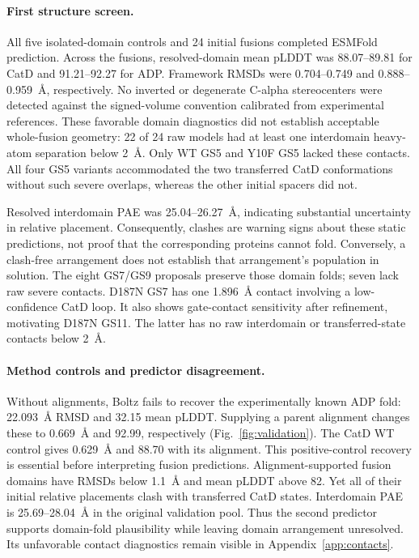 \documentclass{article}
\newcommand{\angstrom}{\textup{\AA}}
\begin{document}
\paragraph{First structure screen.}
All five isolated-domain controls and 24 initial fusions completed ESMFold
prediction. Across the fusions, resolved-domain mean pLDDT was 88.07--89.81 for
CatD and 91.21--92.27 for ADP. Framework RMSDs were 0.704--0.749 and
0.888--0.959~\angstrom, respectively. No inverted or degenerate C-alpha
stereocenters were detected against the signed-volume convention calibrated
from experimental references. These favorable domain diagnostics did not
establish acceptable whole-fusion geometry: 22 of 24 raw models had at least
one interdomain heavy-atom separation below 2~\angstrom. Only WT GS5 and Y10F
GS5 lacked these contacts. All four GS5 variants accommodated the two
transferred CatD conformations without such severe overlaps, whereas the
other initial spacers did not.

Resolved interdomain PAE was 25.04--26.27~\angstrom, indicating substantial
uncertainty in relative placement. Consequently, clashes are warning signs
about these static predictions, not proof that the corresponding proteins
cannot fold. Conversely, a clash-free arrangement does not establish that
arrangement's population in solution. The eight GS7/GS9 proposals preserve those domain
folds; seven lack raw severe contacts. D187N GS7 has one 1.896~\angstrom{}
contact involving a low-confidence CatD loop. It also shows gate-contact
sensitivity after refinement, motivating D187N GS11. The latter has no raw
interdomain or transferred-state contacts below 2~\angstrom.

\paragraph{Method controls and predictor disagreement.}
Without alignments, Boltz fails to recover the experimentally known ADP fold:
22.093~\angstrom{} RMSD and 32.15 mean pLDDT. Supplying a parent alignment
changes these to 0.669~\angstrom{} and 92.99, respectively
(Fig.~\ref{fig:validation}). The CatD WT control gives 0.629~\angstrom{} and
88.70 with its alignment. This positive-control recovery is essential before
interpreting fusion predictions. Alignment-supported fusion domains have
RMSDs below 1.1~\angstrom{} and mean pLDDT above 82. Yet all of their initial
relative placements clash with transferred CatD states. Interdomain PAE is
25.69--28.04~\angstrom{} in the original validation pool. Thus the second
predictor supports domain-fold plausibility while leaving domain arrangement
unresolved. Its unfavorable contact diagnostics remain visible in
Appendix~\ref{app:contacts}.
\end{document}
